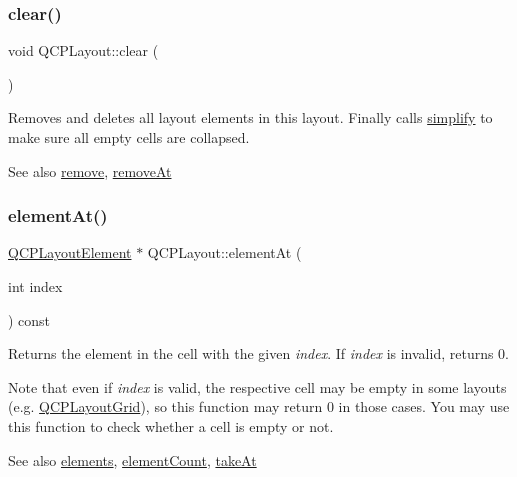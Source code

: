 \subsubsection{\texorpdfstring{clear()}{clear()}}
{\footnotesize\ttfamily void Q\+C\+P\+Layout\+::clear (\begin{DoxyParamCaption}{ }\end{DoxyParamCaption})}

Removes and deletes all layout elements in this layout. Finally calls \mbox{\hyperlink{class_q_c_p_layout_a41e6ac049143866e8f8b4964efab01b2}{simplify}} to make sure all empty cells are collapsed.

\begin{DoxySeeAlso}{See also}
\mbox{\hyperlink{class_q_c_p_layout_a6c58f537d8086f352576ab7c5b15d0bc}{remove}}, \mbox{\hyperlink{class_q_c_p_layout_a2403f684fee3ce47132faaeed00bb066}{remove\+At}} 
\end{DoxySeeAlso}
\mbox{\label{class_q_c_p_layout_afa73ca7d859f8a3ee5c73c9b353d2a56}} 
\subsubsection{\texorpdfstring{elementAt()}{elementAt()}}
{\footnotesize\ttfamily \mbox{\hyperlink{class_q_c_p_layout_element}{Q\+C\+P\+Layout\+Element}} $\ast$ Q\+C\+P\+Layout\+::element\+At (\begin{DoxyParamCaption}\item[{int}]{index }\end{DoxyParamCaption}) const\hspace{0.3cm}{\ttfamily [pure virtual]}}

Returns the element in the cell with the given {\itshape index}. If {\itshape index} is invalid, returns 0.

Note that even if {\itshape index} is valid, the respective cell may be empty in some layouts (e.\+g. \mbox{\hyperlink{class_q_c_p_layout_grid}{Q\+C\+P\+Layout\+Grid}}), so this function may return 0 in those cases. You may use this function to check whether a cell is empty or not.

\begin{DoxySeeAlso}{See also}
\mbox{\hyperlink{class_q_c_p_layout_aca129722c019f91d3367046f80abfa77}{elements}}, \mbox{\hyperlink{class_q_c_p_layout_a39d3e9ef5d9b82ab1885ba1cb9597e56}{element\+Count}}, \mbox{\hyperlink{class_q_c_p_layout_a5a79621fa0a6eabb8b520cfc04fb601a}{take\+At}} 
\end{DoxySeeAlso}


